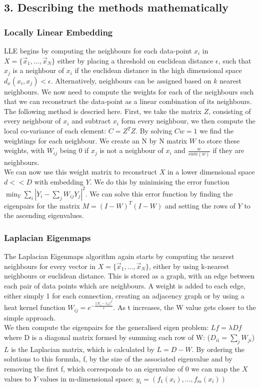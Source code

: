 \documentclass{article}
\begin{document}
\subsection{3. Describing the methods mathematically}
\subsubsection{Locally Linear Embedding}
LLE begins by computing the neighbours for each data-point $x_i$ in $X = \{\vec{x}_1,...,\vec{x}_N\}$ either by placing a threshold on euclidean distance $\epsilon$, such that $x_j$ is a neighbour of $x_i$ if the euclidean distance in the high dimensional space $d_x(x_i,x_j) < \epsilon$. Alternatively, neighbours can be assigned based on $k$ nearest neighbours. We now need to compute the weights for each of the neighbours such that we can reconstruct the data-point as a linear combination of its neighbours. The following method is descried here.\cite{LLERoweis} First, we take the matrix $Z$, consisting of every neighbour of $x_i$ and subtract $x_i$ form every neighbour, we then compute the local co-variance of each element: $C = Z^TZ$. By solving $Cw = 1$ we find the weightings for each neighbour. We create an N by N matrix $W$ to store these weights, with $W_{ij}$ being 0 if $x_j$ is not a neighbour of $x_i$ and $\frac{w}{sum(w)}$ if they are neighbours.\\
We can now use this weight matrix to reconstruct $X$ in a lower dimensional space $d<<D$ with embedding $Y$. We do this by minimising the error function $\min_Y\sum\limits_{i}|Y_i-\sum\limits_{j}W_{ij}Y_j|^2$.\cite{ghodsi2006dimensionality} We can solve this error function by finding the eigenpairs for the matrix $M = (I-W)^T(I-W)$ and setting the rows of $Y$ to the ascending eigenvalues.
\subsubsection{Laplacian Eigenmaps}
The Laplacian Eigenmaps algorithm again starts by computing the nearest neighbours for every vector in $X = \{\vec{x}_1,...,\vec{x}_N\}$, either by using k-nearest neighbours or euclidean distance. This is stored as a graph, with an edge between each pair of data points which are neighbours. A weight is added to each edge, either simply 1 for each connection, creating an adjacency graph or by using a heat kernel function $W_{ij}=e^{-\frac{||X_i-x_k||^2}{t}}$. As t increases, the W value gets closer to the simple approach.\cite{hagueeigen} \\
We then compute the eigenpairs for the generalised eigen problem: $Lf = \lambda Df$ where D is a diagonal matrix formed by summing each row of W: ($D_{ii} = \sum\limits_jW_{ji}$) $L$ is the Laplacian matrix, which is calculated by $L = D-W$. By ordering the solutions to this formula, f, by the size of the associated eigenvalue and by removing the first f, which corresponds to an eigenvalue of 0 we can map the $X$ values to $Y$ values in m-dimensional space: $y_i = (f_1(x_i),...,f_m(x_i))$
\end{document}
